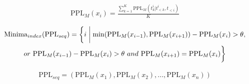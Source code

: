 \documentclass{article}
\begin{document}
\begin{eqnarray}
\text{PPL}_{M}(x_{i})=\frac{ {\textstyle \sum_{k=1}^{K}}\text{PPL}_{M}(t_{k}^{i}|t_{<k }^{i},t_{<i}) }{K} 
\end{eqnarray}

\begin{multline}
\text{Minima}_{index}(\text{PPL}_{seq}) = \biggl\{ i \biggm| \min (\text{PPL}_{M}(x_{i-1}), \text{PPL}_{M}(x_{i+1})) - \text{PPL}_{M}(x_{i}) > \theta, \\
or~\text{PPL}_{M}(x_{i-1}) - \text{PPL}_{M}(x_{i}) > \theta~and~\text{PPL}_{M}(x_{i+1}) = \text{PPL}_{M}(x_{i}) \biggr\}
\end{multline}

\begin{eqnarray}
\text{PPL}_{seq} = (\text{PPL}_M(x_1), \text{PPL}_M(x_2), ..., \text{PPL}_M(x_n))
\end{eqnarray}
\end{document}
